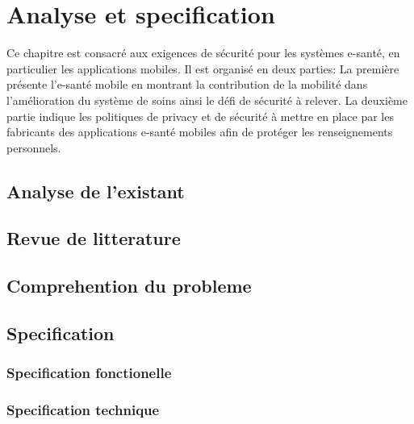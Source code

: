 \chapter{Analyse et specification}

Ce chapitre est consacré aux exigences de sécurité pour les systèmes e-santé, en particulier les applications mobiles. Il est organisé en deux parties: La première présente l'e-santé mobile en montrant la contribution de la mobilité dans l'amélioration du système de soins ainsi le défi de sécurité à relever. La deuxième partie indique les politiques de privacy et de sécurité à mettre en place par les fabricants des applications e-santé mobiles afin de protéger les renseignements personnels.

\section{Analyse de l’existant}
\section{Revue de litterature}
\section{Comprehention du probleme}
\section{Specification}
	\subsection{Specification fonctionelle}
	\subsection{Specification technique}